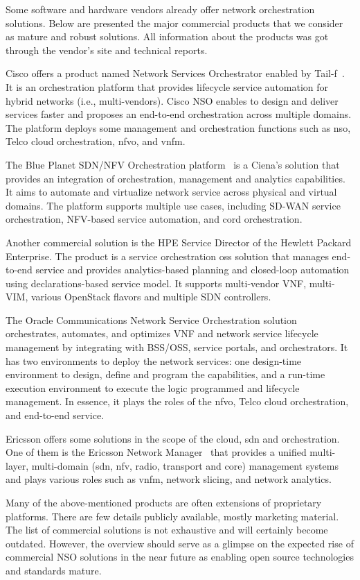 Some software and hardware vendors already offer network orchestration solutions. Below are presented the major commercial products that we consider as mature and robust solutions. All information about the products was got through the vendor's site and technical reports.

Cisco offers a product named Network Services Orchestrator enabled by Tail-f~\cite{CiscoIncNetworkCisco}. It is an orchestration platform that provides lifecycle service automation for hybrid networks (i.e., multi-vendors). Cisco NSO enables to design and deliver services faster and proposes an end-to-end orchestration across multiple domains. The platform deploys some management and orchestration functions such as \gls{nso}, Telco cloud orchestration, \gls{nfvo}, and \gls{vnfm}.    

The Blue Planet SDN/NFV Orchestration platform~\cite{BluePlanet2017BLUESUITE} is a Ciena's solution that provides an integration of orchestration, management and analytics capabilities. It aims to automate and virtualize network service across physical and virtual domains. The platform supports multiple use cases, including SD-WAN service orchestration, NFV-based service automation, and \gls{cord} orchestration.

Another commercial solution is the HPE Service Director of the Hewlett Packard Enterprise. The product is a service orchestration \gls{oss} solution that manages end-to-end service and provides analytics-based planning and closed-loop automation using declarations-based service model. It supports multi-vendor VNF, multi-VIM, various OpenStack flavors and multiple SDN controllers.

The Oracle Communications Network Service Orchestration solution~\cite{OracleCommunicationsOracleSolution} orchestrates, automates, and optimizes VNF and network service lifecycle management by integrating with BSS/OSS, service portals, and orchestrators. It has two environments to deploy the network services: one design-time environment to design, define and program the capabilities, and a run-time execution environment to execute the logic programmed and lifecycle management. In essence, it plays the roles of the \gls{nfvo}, Telco cloud orchestration, and end-to-end service.  

Ericsson offers some solutions in the scope of the cloud, \gls{sdn} and orchestration. One of them is the Ericsson Network Manager~\cite{EricssonInc.EricssonManager} that provides a unified multi-layer, multi-domain (\gls{sdn}, \gls{nfv}, radio, transport and core) management systems and plays various roles such as \gls{vnfm}, network slicing, and network analytics. 

Many of the above-mentioned products  are often extensions of proprietary platforms. There are few details publicly available, mostly marketing material. The list of commercial solutions is not exhaustive and will certainly become outdated. However, the overview should serve as a glimpse on the expected rise of commercial NSO solutions in the near future as  enabling open source technologies and standards mature.